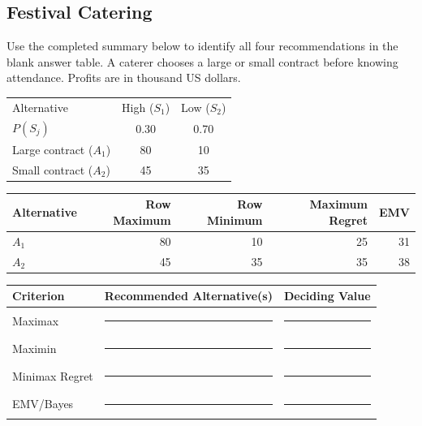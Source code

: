 \subsection{Festival Catering}\label{sec:c8-festival}
Use the completed summary below to identify all four recommendations in the blank answer table.
A caterer chooses a large or small contract before knowing attendance. Profits are in thousand US dollars.
\begin{center}
\begin{tabular}{lcc}\toprule
Alternative & High ($S_1$) & Low ($S_2$)\\
$P(S_j)$ & 0.30 & 0.70\\\midrule
Large contract ($A_1$) & 80 & 10\\
Small contract ($A_2$) & 45 & 35\\\bottomrule
\end{tabular}
\end{center}
\begin{center}
\begin{tabular}{lrrrr}\toprule
Alternative & Row Maximum & Row Minimum & Maximum Regret & EMV\\\midrule
$A_1$ & 80 & 10 & 25 & 31\\
$A_2$ & 45 & 35 & 35 & 38\\\bottomrule
\end{tabular}
\end{center}
\begin{center}
\begin{tabular}{lll}\toprule
Criterion & Recommended Alternative(s) & Deciding Value\\\midrule
Maximax & \rule{3cm}{0.4pt} & \rule{2cm}{0.4pt}\\
Maximin & \rule{3cm}{0.4pt} & \rule{2cm}{0.4pt}\\
Minimax Regret & \rule{3cm}{0.4pt} & \rule{2cm}{0.4pt}\\
EMV/Bayes & \rule{3cm}{0.4pt} & \rule{2cm}{0.4pt}\\\bottomrule
\end{tabular}
\end{center}



